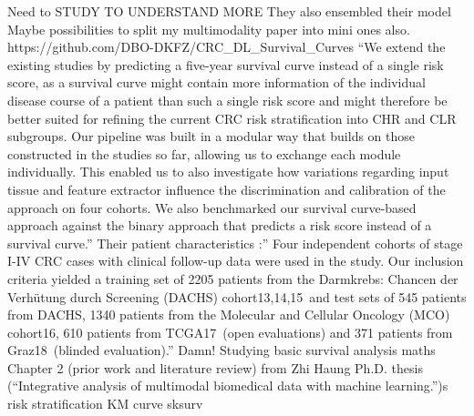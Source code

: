 \documentclass{article}%
\begin{document}
\newline%
%
Need to STUDY TO UNDERSTAND MORE %
\newline%
\newline%
%
They also ensembled their model %
\newline%
\newline%
%
Maybe possibilities to split my multimodality paper into mini ones also. %
\newline%
\newline%
%
https://github.com/DBO{-}DKFZ/CRC\_DL\_Survival\_Curves %
\newline%
\newline%
%
“We extend the existing studies by predicting a five{-}year survival curve instead of a single risk score, as a survival curve might contain more information of the individual disease course of a patient than such a single risk score and might therefore be better suited for refining the current CRC risk stratification into CHR and CLR subgroups. Our pipeline was built in a modular way that builds on those constructed in the studies so far, allowing us to exchange each module individually. This enabled us to also investigate how variations regarding input tissue and feature extractor influence the discrimination and calibration of the approach on four cohorts. We also benchmarked our survival curve{-}based approach against the binary approach that predicts a risk score instead of a survival curve.”%
\newline%
\newline%
%
Their patient characteristics :” Four independent cohorts of stage I{-}IV CRC cases with clinical follow{-}up data were used in the study. Our inclusion criteria yielded a training set of 2205 patients from the Darmkrebs: Chancen der Verhütung durch Screening (DACHS) cohort13,14,15~and test sets of 545 patients from DACHS, 1340 patients from the Molecular and Cellular Oncology (MCO) cohort16, 610 patients from TCGA17~(open evaluations) and 371 patients from Graz18~(blinded evaluation).” Damn! %
\newline%
\newline%
%
Studying basic survival analysis maths %
\newline%
\newline%
%
Chapter 2 (prior work and literature review) from Zhi Haung Ph.D. thesis (“Integrative analysis of multimodal biomedical data with machine learning.”)s%
\newline%
\newline%
%
risk stratification KM curve sksurv%
\end{document}
